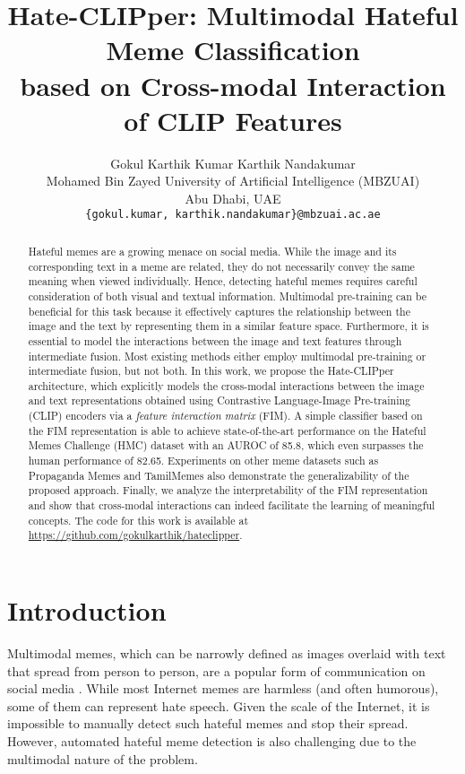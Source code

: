 \documentclass[11pt]{article}
\title{Hate-CLIPper: Multimodal Hateful Meme Classification \\ based on Cross-modal Interaction of CLIP Features}
\author{Gokul Karthik Kumar \quad Karthik Nandakumar \\
  Mohamed Bin Zayed University of Artificial Intelligence (MBZUAI) \\
  Abu Dhabi, UAE \\
  \tt{\{gokul.kumar, karthik.nandakumar\}@mbzuai.ac.ae} \\
  }
\begin{document}
\maketitle
\begin{abstract}
Hateful memes are a growing menace on social media. While the image and its corresponding text in a meme are related, they do not necessarily convey the same meaning when viewed individually. Hence, detecting hateful memes requires careful consideration of both visual and textual information. Multimodal pre-training can be beneficial for this task because it effectively captures the relationship between the image and the text by representing them in a similar feature space. Furthermore, it is essential to model the interactions between the image and text features through intermediate fusion. Most existing methods either employ multimodal pre-training or intermediate fusion, but not both. In this work, we propose the Hate-CLIPper architecture, which explicitly models the cross-modal interactions between the image and text representations obtained using Contrastive Language-Image Pre-training (CLIP) encoders via a \emph{feature interaction matrix} (FIM). A simple classifier based on the FIM representation is able to achieve state-of-the-art performance on the Hateful Memes Challenge (HMC) dataset with an AUROC of 85.8, which even surpasses the human performance of 82.65. Experiments on other meme datasets such as Propaganda Memes and TamilMemes also demonstrate the generalizability of the proposed approach. Finally, we analyze the interpretability of the FIM representation and show that cross-modal interactions can indeed facilitate the learning of meaningful concepts. The code for this work is available at \url{https://github.com/gokulkarthik/hateclipper}.

\end{abstract}

\section{Introduction}

Multimodal memes, which can be narrowly defined as images overlaid with text that spread from person to person, are a popular form of communication on social media \citep{kiela2020hateful}. While most Internet memes are harmless (and often humorous), some of them can represent hate speech. Given the scale of the Internet, it is impossible to manually detect such hateful memes and stop their spread. However, automated hateful meme detection is also challenging due to the multimodal nature of the problem. 
\end{document}
